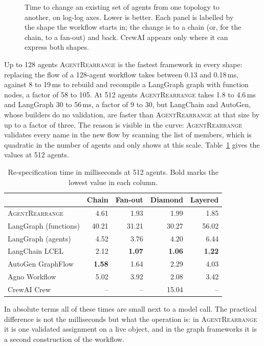 \documentclass[11pt]{article}
\newcommand{\AR}{\textsc{AgentRearrange}}
\begin{document}
\begin{figure}[ht]
\vspace{2pt}
\caption{Time to change an existing set of agents from one topology to another, on log-log axes. Lower is better. Each panel is labelled by the shape the workflow starts in; the change is to a chain (or, for the chain, to a fan-out) and back. CrewAI appears only where it can express both shapes.}
\label{fig:rearrange}
\end{figure}

Up to 128 agents \AR{} is the fastest framework in every shape: replacing the flow of a 128-agent workflow takes between 0.13 and 0.18\,ms, against 8 to 19\,ms to rebuild and recompile a LangGraph graph with function nodes, a factor of 58 to 105. At 512 agents \AR{} takes 1.8 to 4.6\,ms and LangGraph 30 to 56\,ms, a factor of 9 to 30, but LangChain and AutoGen, whose builders do no validation, are faster than \AR{} at that size by up to a factor of three. The reason is visible in the curve: \AR{} validates every name in the new flow by scanning the list of members, which is quadratic in the number of agents and only shows at this scale. Table~\ref{tab:rearrange} gives the values at 512 agents.

\begin{table}[ht]
\centering
\small
\begin{tabular}{@{}l rrrr@{}}
\toprule
 & Chain & Fan-out & Diamond & Layered \\
\midrule
\AR{} & 4.61 & 1.93 & 1.99 & 1.85 \\
LangGraph (functions) & 40.21 & 31.21 & 30.27 & 56.02 \\
LangGraph (agents) & 4.52 & 3.76 & 4.20 & 6.44 \\
LangChain LCEL & 2.12 & \textbf{1.07} & \textbf{1.06} & \textbf{1.22} \\
AutoGen GraphFlow & \textbf{1.58} & 1.64 & 2.29 & 4.03 \\
Agno Workflow & 5.02 & 3.92 & 2.08 & 3.42 \\
CrewAI Crew & -- & -- & 15.04 & -- \\
\bottomrule
\end{tabular}
\caption{Re-specification time in milliseconds at 512 agents. Bold marks the lowest value in each column.}
\label{tab:rearrange}
\end{table}

In absolute terms all of these times are small next to a model call. The practical difference is not the milliseconds but what the operation is: in \AR{} it is one validated assignment on a live object, and in the graph frameworks it is a second construction of the workflow.
\end{document}
